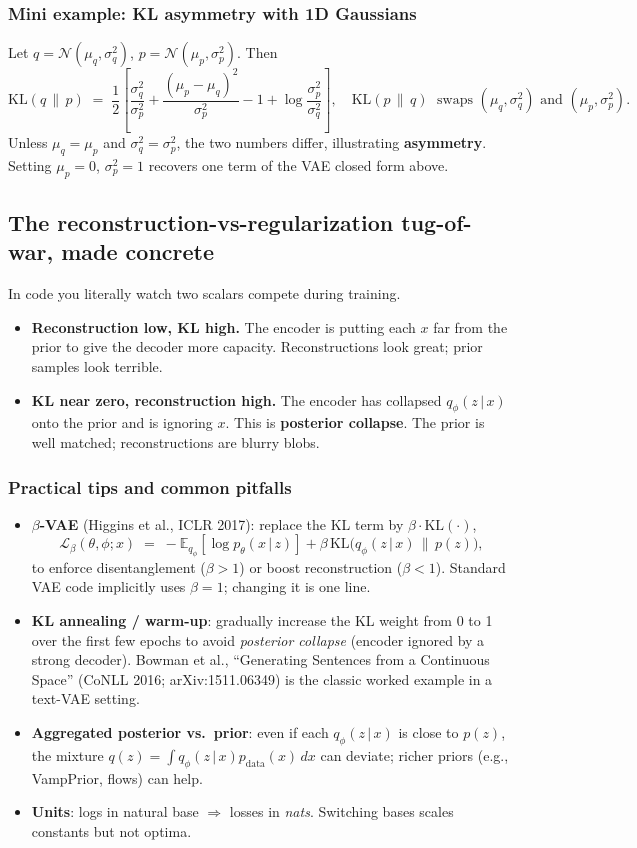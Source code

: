 \documentclass[11pt]{article}
\newcommand{\E}{\mathbb{E}}
\newcommand{\KL}{\mathrm{KL}}
\newcommand{\given}{\,\vert\,}
\theoremstyle{remark}
\begin{document}
\subsubsection*{Mini example: KL asymmetry with 1D Gaussians}
Let $q=\mathcal N(\mu_q,\sigma_q^2)$, $p=\mathcal N(\mu_p,\sigma_p^2)$. Then
\[
\KL(q\,\|\,p) \;=\; \frac{1}{2}\!\left[\frac{\sigma_q^2}{\sigma_p^2}
+ \frac{(\mu_p-\mu_q)^2}{\sigma_p^2}
-1 + \log\frac{\sigma_p^2}{\sigma_q^2}\right],
\quad
\KL(p\,\|\,q) \;\text{ swaps $(\mu_q,\sigma_q^2)$ and $(\mu_p,\sigma_p^2)$}.
\]
Unless $\mu_q=\mu_p$ and $\sigma_q^2=\sigma_p^2$, the two numbers differ, illustrating \textbf{asymmetry}. Setting $\mu_p=0$, $\sigma_p^2=1$ recovers one term of the VAE closed form above.

\subsection{The reconstruction-vs-regularization tug-of-war, made concrete}
In code you literally watch two scalars compete during training.
\begin{itemize}[leftmargin=1.2em]
  \item \textbf{Reconstruction low, KL high.} The encoder is putting each $x$ far from the prior to give the decoder more capacity. Reconstructions look great; prior samples look terrible.
  \item \textbf{KL near zero, reconstruction high.} The encoder has collapsed $q_\phi(z\given x)$ onto the prior and is ignoring $x$. This is \textbf{posterior collapse}. The prior is well matched; reconstructions are blurry blobs.
\end{itemize}

\subsubsection*{Practical tips and common pitfalls}
\begin{itemize}[leftmargin=1.2em]
  \item \textbf{$\beta$-VAE} (Higgins et al., ICLR 2017): replace the KL term by $\beta\cdot \KL(\cdot)$,
  \[
  \mathcal L_{\beta}(\theta,\phi;x) \;=\; -\E_{q_\phi}[\log p_\theta(x\given z)] + \beta\,\KL\!\big(q_\phi(z\given x)\,\|\,p(z)\big),
  \]
  to enforce disentanglement ($\beta>1$) or boost reconstruction ($\beta<1$). Standard VAE code implicitly uses $\beta=1$; changing it is one line.
  \item \textbf{KL annealing / warm-up}: gradually increase the KL weight from 0 to 1 over the first few epochs to avoid \textit{posterior collapse} (encoder ignored by a strong decoder). Bowman et al., ``Generating Sentences from a Continuous Space'' (CoNLL 2016; arXiv:1511.06349) is the classic worked example in a text-VAE setting.
  \item \textbf{Aggregated posterior vs.\ prior}: even if each $q_\phi(z\given x)$ is close to $p(z)$, the mixture $q(z)=\int q_\phi(z\given x)p_{\text{data}}(x)\,dx$ can deviate; richer priors (e.g., VampPrior, flows) can help.
  \item \textbf{Units}: logs in natural base $\Rightarrow$ losses in \emph{nats}. Switching bases scales constants but not optima.
\end{itemize}
\end{document}
